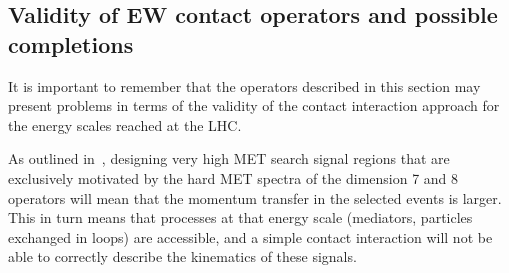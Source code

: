 %
%
%
%


\subsection{Validity of EW contact operators and possible completions}
\label{sub:validityEWContact}

It is important to remember that the operators described in 
this section may present problems in terms of the validity of the contact interaction
approach for the energy scales reached at the LHC. 

As outlined in~\cite{Berlin:2014cfa}, designing very high MET search signal regions
that are exclusively motivated by the hard MET spectra of the dimension 7 and 8 operators
will mean that the momentum transfer in the selected events is larger. This in turn
means that processes at that energy scale (mediators, particles exchanged in loops)
are accessible, and a simple contact interaction will not be able to correctly
describe the kinematics of these signals. 

